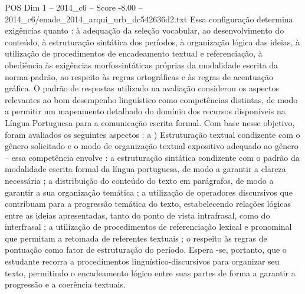 \begin{textsample}{POS Dim 1 – 2014\_c6 – Score -8.00 – 2014\_c6/enade\_2014\_arqui\_urb\_dc542636d2.txt}
Essa configuração determina exigências quanto : à adequação da seleção vocabular, ao desenvolvimento do conteúdo, à estruturação sintática dos períodos, à organização lógica das ideias, à utilização de procedimentos de encadeamento textual e referenciação, à obediência às exigências morfossintáticas próprias da modalidade escrita da norma-padrão, ao respeito às regras ortográficas e às regras de acentuação gráfica.
O padrão de respostas utilizado na avaliação considerou os aspectos relevantes ao bom desempenho linguístico como competências distintas, de modo a permitir um mapeamento detalhado do domínio dos recursos disponíveis na Língua Portuguesa para a comunicação escrita formal.
Com base nesse objetivo, foram avaliados os seguintes aspectos : a ) Estruturação textual condizente com o gênero solicitado e o modo de organização textual expositivo adequado ao gênero – essa competência envolve : a estruturação sintática condizente com o padrão da modalidade escrita formal da língua portuguesa, de modo a garantir a clareza necessária ; a distribuição do conteúdo do texto em parágrafos, de modo a garantir a sua organização temática ; a utilização de operadores discursivos que contribuam para a progressão temática do texto, estabelecendo relações lógicas entre as ideias apresentadas, tanto do ponto de vista intrafrasal, como do interfrasal ; a utilização de procedimentos de referenciação lexical e pronominal que permitam a retomada de referentes textuais ; o respeito às regras de pontuação como fator de estruturação do período.
Espera -se, portanto, que o estudante recorra a procedimentos linguístico-discursivos para organizar seu texto, permitindo o encadeamento lógico entre suas partes de forma a garantir a progressão e a coerência textuais.

\end{textsample}
